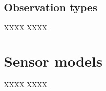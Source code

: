 \documentclass[a4paper,11pt]{article}
\begin{document}
\subsection{Observation types}

XXXX XXXX 


\section{Sensor models}

XXXX XXXX 




\newpage


\end{document}
